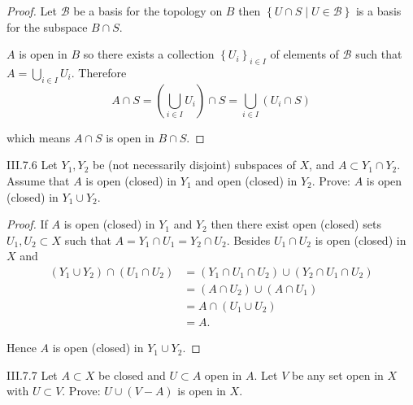 \begin{proof}
	Let \( \mathscr{B} \) be a basis for the topology on \(B\) then \( \left\{ U \cap S \mid U \in \mathscr{B} \right\} \) is a basis for the subspace \( B \cap S \).

	\( A \) is open in \( B \) so there exists a collection \( {\left\{ U_{i} \right\}}_{i\in I} \) of elements of \( \mathscr{B} \) such that \( A = \bigcup_{i\in I} U_{i} \). Therefore
	\[
		A \cap S = \left(\bigcup_{i\in I} U_{i}\right) \cap S = \bigcup_{i\in I} (U_{i} \cap S)
	\]

	which means \( A \cap S \) is open in \( B \cap S \).
\end{proof}

\begin{problem}{III.7.6}
Let \( Y_{1}, Y_{2} \) be (not necessarily disjoint) subspaces of \(X\), and \( A \subset Y_{1} \cap Y_{2} \). Assume that \( A \) is open (closed) in \(Y_{1}\) and open (closed) in \(Y_{2}\). Prove: \( A \) is open (closed) in \( Y_{1} \cup Y_{2} \).
\end{problem}

\begin{proof}
	If \( A \) is open (closed) in \( Y_{1} \) and \( Y_{2} \) then there exist open (closed) sets \( U_{1}, U_{2} \subset X \) such that \( A = Y_{1} \cap U_{1} = Y_{2} \cap U_{2} \). Besides \( U_{1} \cap U_{2} \) is open (closed) in \(X\) and
	\begingroup
	\allowdisplaybreaks%
	\begin{align*}
		(Y_{1} \cup Y_{2}) \cap (U_{1} \cap U_{2}) & = (Y_{1} \cap U_{1} \cap U_{2}) \cup (Y_{2} \cap U_{1} \cap U_{2}) \\
		                                           & = (A \cap U_{2}) \cup (A \cap U_{1})                               \\
		                                           & = A \cap (U_{1} \cup U_{2})                                        \\
		                                           & = A.
	\end{align*}
	\endgroup

	Hence \( A \) is open (closed) in \( Y_{1} \cup Y_{2} \).
\end{proof}

\begin{problem}{III.7.7}
Let \(A \subset X\) be closed and \( U \subset A \) open in \(A\). Let \(V\) be any set open in \(X\) with \( U \subset V \). Prove: \( U \cup (V - A) \) is open in \(X\).
\end{problem}

